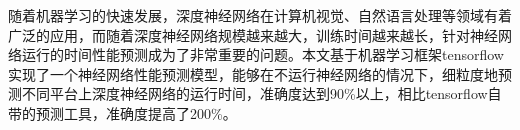 
\begin{cabstract}
    随着机器学习的快速发展，深度神经网络在计算机视觉、自然语言处理等领域有着广泛的应用，而随着深度神经网络规模越来越大，训练时间越来越长，针对神经网络运行的时间性能预测成为了非常重要的问题。本文基于机器学习框架tensorflow实现了一个神经网络性能预测模型，能够在不运行神经网络的情况下，细粒度地预测不同平台上深度神经网络的运行时间，准确度达到90\%以上，相比tensorflow自带的预测工具，准确度提高了200\%。

\end{cabstract}


\begin{eabstract}

\end{eabstract}


